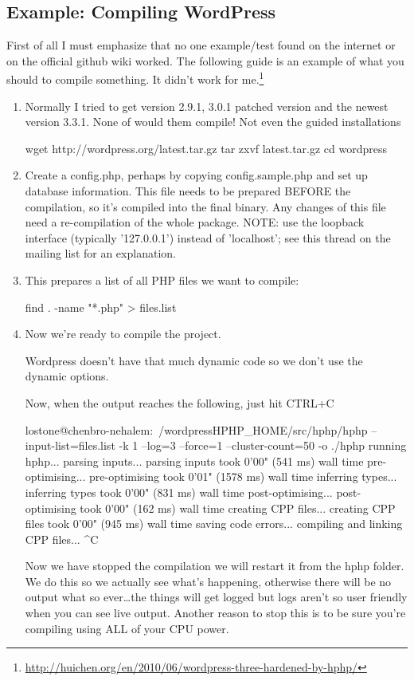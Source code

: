 \subsection{Example: Compiling WordPress}
First of all I must emphasize that no one example/test found on the internet or on the official github wiki worked. The following guide is an example of what you should to compile something. It didn't work for me.\footnote{\url{http://huichen.org/en/2010/06/wordpress-three-hardened-by-hphp/}}
\begin{enumerate}
\item 	Normally I tried to get version 2.9.1, 3.0.1 patched version and the newest version 3.3.1. None of  would them compile! Not even the guided installations
\begin{codelisting}
wget http://wordpress.org/latest.tar.gz
tar zxvf latest.tar.gz
cd wordpress
\end{codelisting}
\item  Create a config.php, perhaps by copying config.sample.php and set up database information. This file needs to be prepared BEFORE the compilation, so it's compiled into the final binary. 
Any changes of this file need a re-compilation of the whole package. NOTE: use the loopback interface (typically '127.0.0.1') instead of 'localhost'; see this thread on the mailing list for an explanation.
\item This prepares a list of all PHP files we want to compile:
\begin{codelisting}
	find . -name "*.php" > files.list
\end{codelisting}
\item Now we're ready to compile the project.

Wordpress doesn't have that much dynamic code so we don't use the dynamic options.

Now, when the output reaches the following, just hit CTRL+C
\begin{codelisting}
lostone@chenbro-nehalem:~/wordpress$ $HPHP_HOME/src/hphp/hphp --
input-list=files.list -k 1 --log=3
--force=1 --cluster-count=50 -o
./hphp
running hphp...
parsing inputs...
parsing inputs took 0'00" (541 ms) wall time
pre-optimising...
pre-optimising took 0'01" (1578 ms) wall time
inferring types...
inferring types took 0'00" (831 ms) wall time
post-optimising...
post-optimising took 0'00" (162 ms) wall time
creating CPP files...
creating CPP files took 0'00" (945 ms) wall time
saving code errors...
compiling and linking CPP files...
^C
\end{codelisting}
Now we have stopped the compilation we will restart it from the hphp folder. We do this so we actually see what's happening, otherwise there will be no output what so ever\ldots the things will get logged but logs aren't so user friendly when you can see live output.
Another reason to stop this is to be sure you're compiling using ALL of your CPU power.


\end{enumerate}
